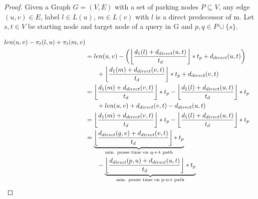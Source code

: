 \begin{proof}
	Given a Graph $G=(V,E)$ with a set of parking nodes $P \subseteq V$, any edge $(u,v) \in E$, label $l \in L(u)$, $m \in L(v)$ with $l$ is a direct predecessor of m. Let $s,t \in V$ be starting node and target node of a query in G and $p,q \in P \cup \{s\}$.

	\begin{align}
		\begin{split}\label{eq:label_feasibility_proof_1}
			len(u,v) - \pi_t(l,u) + \pi_t  (m,v)                                                                                                                                                                                                       \\
			& =  len(u,v) - \left(\floor*{ \frac{d_1(l) + d_{direct}(u,t)}{t_d} } * t_p + d_{direct}(u,t)\right)                                                                                                                                      \\
			& \phantom{{}=1} +  \floor*{ \frac{d_1(m) + d_{direct}(v,t)}{t_d} } * t_p + d_{direct}(v,t)                                                                                                                                               \\
			& =  \floor*{ \frac{d_1(m) + d_{direct}(v,t)}{t_d} } * t_p - \floor*{ \frac{d_1(l) + d_{direct}(u,t)}{t_d} } * t_p                                                                                                                        \\
			& \phantom{{}=1} + len(u,v) + d_{direct}(v,t) - d_{direct}(u,t)                                                                                                                                                                           \\
			& =   \floor*{ \frac{d_1(m) + d_{direct}(v,t)}{t_d} } * t_p - \floor*{ \frac{d_1(l) + d_{direct}(u,t)}{t_d} } * t_p                                                                                                                       \\
			& =  \underbrace{ \floor*{ \frac{d_{direct}(q,v) + d_{direct}(v,t)}{t_d} } * t_p}_\text{min. pause time on q-v-t path}\\
			& \phantom{{}=1} - \underbrace{\floor*{ \frac{d_{direct}(p,u) + d_{direct}(u,t)}{t_d} } * t_p}_\text{min. pause time on p-u-t path}
		\end{split}
	\end{align}


\end{proof}
